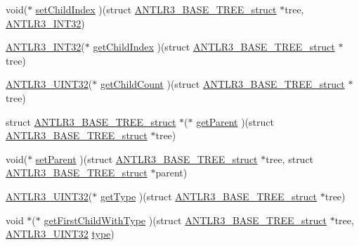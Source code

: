 \begin{DoxyCompactItemize}
\item 
void($\ast$ \hyperlink{struct_a_n_t_l_r3___b_a_s_e___t_r_e_e__struct_a41f42cb600ed1f9f4bf82d64600b6e15}{set\-Child\-Index} )(struct \hyperlink{struct_a_n_t_l_r3___b_a_s_e___t_r_e_e__struct}{A\-N\-T\-L\-R3\-\_\-\-B\-A\-S\-E\-\_\-\-T\-R\-E\-E\-\_\-struct} $\ast$tree, \hyperlink{antlr3defs_8h_a6faef5c4687f8eb633d2aefea93973ca}{A\-N\-T\-L\-R3\-\_\-\-I\-N\-T32})
\item 
\hyperlink{antlr3defs_8h_a6faef5c4687f8eb633d2aefea93973ca}{A\-N\-T\-L\-R3\-\_\-\-I\-N\-T32}($\ast$ \hyperlink{struct_a_n_t_l_r3___b_a_s_e___t_r_e_e__struct_ac14833b2be00ac175f02e7b131ba93fa}{get\-Child\-Index} )(struct \hyperlink{struct_a_n_t_l_r3___b_a_s_e___t_r_e_e__struct}{A\-N\-T\-L\-R3\-\_\-\-B\-A\-S\-E\-\_\-\-T\-R\-E\-E\-\_\-struct} $\ast$tree)
\item 
\hyperlink{antlr3defs_8h_ac41f744abd0fd25144b9eb9d11b1dfd1}{A\-N\-T\-L\-R3\-\_\-\-U\-I\-N\-T32}($\ast$ \hyperlink{struct_a_n_t_l_r3___b_a_s_e___t_r_e_e__struct_a14c3f34c1ea0380fae07a1b2e7d94cf2}{get\-Child\-Count} )(struct \hyperlink{struct_a_n_t_l_r3___b_a_s_e___t_r_e_e__struct}{A\-N\-T\-L\-R3\-\_\-\-B\-A\-S\-E\-\_\-\-T\-R\-E\-E\-\_\-struct} $\ast$tree)
\item 
struct \hyperlink{struct_a_n_t_l_r3___b_a_s_e___t_r_e_e__struct}{A\-N\-T\-L\-R3\-\_\-\-B\-A\-S\-E\-\_\-\-T\-R\-E\-E\-\_\-struct} $\ast$($\ast$ \hyperlink{struct_a_n_t_l_r3___b_a_s_e___t_r_e_e__struct_a72360ea28103f0bc166fedef0637647e}{get\-Parent} )(struct \hyperlink{struct_a_n_t_l_r3___b_a_s_e___t_r_e_e__struct}{A\-N\-T\-L\-R3\-\_\-\-B\-A\-S\-E\-\_\-\-T\-R\-E\-E\-\_\-struct} $\ast$tree)
\item 
void($\ast$ \hyperlink{struct_a_n_t_l_r3___b_a_s_e___t_r_e_e__struct_ad01bb7cd22fb767ea03a94f1d7019784}{set\-Parent} )(struct \hyperlink{struct_a_n_t_l_r3___b_a_s_e___t_r_e_e__struct}{A\-N\-T\-L\-R3\-\_\-\-B\-A\-S\-E\-\_\-\-T\-R\-E\-E\-\_\-struct} $\ast$tree, struct \hyperlink{struct_a_n_t_l_r3___b_a_s_e___t_r_e_e__struct}{A\-N\-T\-L\-R3\-\_\-\-B\-A\-S\-E\-\_\-\-T\-R\-E\-E\-\_\-struct} $\ast$parent)
\item 
\hyperlink{antlr3defs_8h_ac41f744abd0fd25144b9eb9d11b1dfd1}{A\-N\-T\-L\-R3\-\_\-\-U\-I\-N\-T32}($\ast$ \hyperlink{struct_a_n_t_l_r3___b_a_s_e___t_r_e_e__struct_a9782f2448491bcc3ba230ff988048631}{get\-Type} )(struct \hyperlink{struct_a_n_t_l_r3___b_a_s_e___t_r_e_e__struct}{A\-N\-T\-L\-R3\-\_\-\-B\-A\-S\-E\-\_\-\-T\-R\-E\-E\-\_\-struct} $\ast$tree)
\item 
void $\ast$($\ast$ \hyperlink{struct_a_n_t_l_r3___b_a_s_e___t_r_e_e__struct_ac6fb5917cfb0aeacb9e248065d84557f}{get\-First\-Child\-With\-Type} )(struct \hyperlink{struct_a_n_t_l_r3___b_a_s_e___t_r_e_e__struct}{A\-N\-T\-L\-R3\-\_\-\-B\-A\-S\-E\-\_\-\-T\-R\-E\-E\-\_\-struct} $\ast$tree, \hyperlink{antlr3defs_8h_ac41f744abd0fd25144b9eb9d11b1dfd1}{A\-N\-T\-L\-R3\-\_\-\-U\-I\-N\-T32} \hyperlink{convert2cfg_8m_a2902a7a983ab04c79cae2162ad553481}{type})

\end{DoxyCompactItemize}

